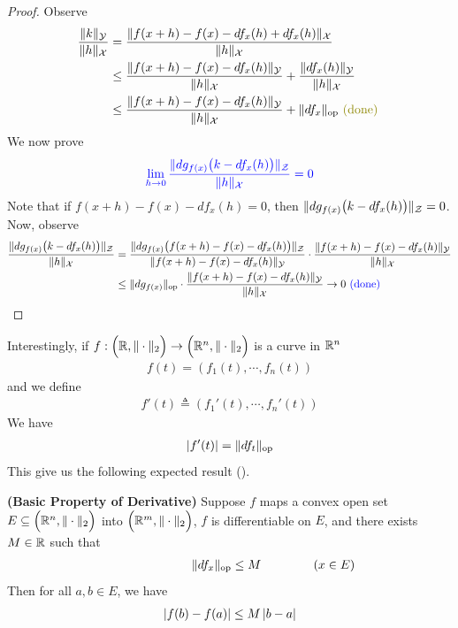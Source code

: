 \documentclass{report}
\begin{document}
\begin{proof}
Observe 
\begin{align*}
\frac{\norm{k}_\mathcal{Y}}{\norm{h}_\mathcal{X}}&= \frac{\norm{f(x+h)-f(x)-df_x(h)+df_x(h)}_\mathcal{X}}{\norm{h}_\mathcal{X}}\\
&\leq \frac{\norm{f(x+h)-f(x)-df_x(h)}_\mathcal{Y}}{\norm{h}_\mathcal{X}}+\frac{\norm{df_x(h)}_\mathcal{Y}}{\norm{h}_\mathcal{X}}\\
&\leq \frac{\norm{f(x+h)-f(x)-df_x(h)}_\mathcal{Y}}{\norm{h}_\mathcal{X}} + \norm{df_x}_\text{op} \odone
\end{align*}
We now prove 
\begin{align*}
\textcolor{blue}{\lim_{h\to 0} \frac{\| dg_{f(x)}\big(k-df_x(h) \big) \|_\mathcal{Z}}{\| h \|_\mathcal{X}}=0}
\end{align*}
Note that if $f(x+h)-f(x)-df_x(h)=0$, then $\| dg_{f(x)}\big(k-df_x(h) \big) \|_\mathcal{Z}=0$. Now, observe 
\begin{align*}
\frac{\| dg_{f(x)}\big(k-df_x(h) \big) \|_\mathcal{Z}}{\| h \|_\mathcal{X}}&= \frac{\| dg_{f(x)}\big(f(x+h)-f(x)-df_x(h) \big) \|_\mathcal{Z}}{\| f(x+h)-f(x)-df_x(h) \|_\mathcal{Y}}\cdot \frac{\| f(x+h)-f(x)-df_x(h) \|_\mathcal{Y}}{\| h \|_\mathcal{X}}\\
&\leq \| dg_{f(x)} \|_\text{op}\cdot \frac{\| f(x+h)-f(x)-df_x(h) \|_\mathcal{Y}}{\| h \|_\mathcal{X}}\to 0 \textcolor{blue}{\text{ (done) }}
\end{align*}
\end{proof}
\begin{mdframed}
Interestingly, if $f:\Big(\mathbb{R},\| \cdot \|_2 \Big)\rightarrow \Big(\mathbb{R}^n , \| \cdot \|_2\Big)$ is a curve in $\mathbb{R}^n$ 
\begin{align*}
f(t)=(f_1(t),\cdots , f_n(t))
\end{align*}
and we define 
\begin{align*}
f'(t)\triangleq (f_1'(t),\cdots ,f_n'(t))
\end{align*}
We have 
\begin{align*}
\left|f'(t)\right|= \| df_t \|_{\text{op}}
\end{align*}
This give us the following expected result (). 
\end{mdframed}
\begin{theorem}
\label{BPoDB}
\textbf{(Basic Property of Derivative)} Suppose $f$ maps a convex open set $E\subseteq \Big(\mathbb{R}^n,\| \cdot \|_2 \Big)$ into $\Big(\mathbb{R}^m,\| \cdot \|_2 \Big)$,  $f$ is differentiable on $E$, and there exists $M\in\mathbb{R}$ such that 
\begin{align*}
\hspace{2.5cm}\| df_x \|_\text{op}\leq M\hspace{1.5cm}(x \in E)
\end{align*}
Then for all $a,b \in E$, we have
\begin{align*}
\left|f(b)-f(a)\right|\leq M \left|b-a\right|
\end{align*}
\end{theorem}
\end{document}
